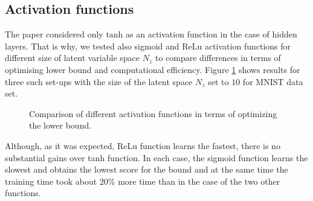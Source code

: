 \documentclass[../report.tex]{subfiles}
\begin{document}
\subsection{Activation functions}
The paper considered only $\text{tanh}$ as an activation function in the case of hidden layers. That is why, we tested also sigmoid and ReLu activation functions for different size of latent variable space $N_z$ to compare differences in terms of optimising lower bound and computational efficiency. Figure \ref{fig:mnist_activation} shows results for three such set-ups with the size of the latent space  $N_z$ set to $10$ for MNIST data set.

\begin{figure}[!htb]
\centering
  \caption[1]{Comparison of different activation functions in terms of optimizing the lower bound. }
\label{fig:mnist_activation}
\end{figure}

Although, as it was expected, ReLu function learns the fastest, there is no substantial gains over tanh function. In each case, the sigmoid function learns the slowest and obtains the lowest score for the bound and at the same time the training time took about $20\%$ more time than in the case of the two other functions.
\end{document}
